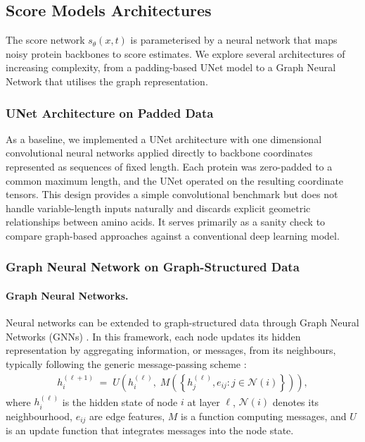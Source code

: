 \documentclass[a4paper,12pt]{article}
\begin{document}
\subsection{Score Models Architectures}\label{subsec:architectures}
The score network \(s_\theta(x,t)\) is parameterised by a neural network that maps noisy protein backbones to score estimates. We explore several architectures of increasing complexity, from a padding-based UNet model to a Graph Neural Network that utilises the graph representation.

\subsubsection{UNet Architecture on Padded Data}
As a baseline, we implemented a UNet architecture \citep{ronneberger2015UNetConvolutionalNetworks} with one dimensional convolutional neural networks applied directly to backbone coordinates represented as sequences of fixed length. Each protein was zero-padded to a common maximum length, and the UNet operated on the resulting coordinate tensors. This design provides a simple convolutional benchmark but does not handle variable-length inputs naturally and discards explicit geometric relationships between amino acids. It serves primarily as a sanity check to compare graph-based approaches against a conventional deep learning model.

\subsubsection{Graph Neural Network on Graph-Structured Data}\label{subsubsec:Transformer-GCN}
\paragraph{Graph Neural Networks.}
Neural networks can be extended to graph-structured data through Graph Neural Networks (GNNs) \citep{scarselliGraphNeuralNetwork2009,gilmer2017NeuralMessagePassing,battaglia2018RelationalInductiveBiases}. In this framework, each node updates its hidden representation by aggregating information, or messages, from its neighbours, typically following the generic message-passing scheme \citep{gilmer2017NeuralMessagePassing}:
\begin{align}\label{eq:GNN-message-passing}
    h_i^{(\ell+1)} \;=\; U\!\left(h_i^{(\ell)}, \; M\!\left(\left\{h_j^{(\ell)}, e_{ij} : j \in \mathcal{N}(i)\right\}\right)\right),
\end{align}
where \(h_i^{(\ell)}\) is the hidden state of node \(i\) at layer \(\ell\), \(\mathcal{N}(i)\) denotes its neighbourhood, \(e_{ij}\) are edge features, \(M\) is a function computing messages, and \(U\) is an update function that integrates messages into the node state.
\end{document}
